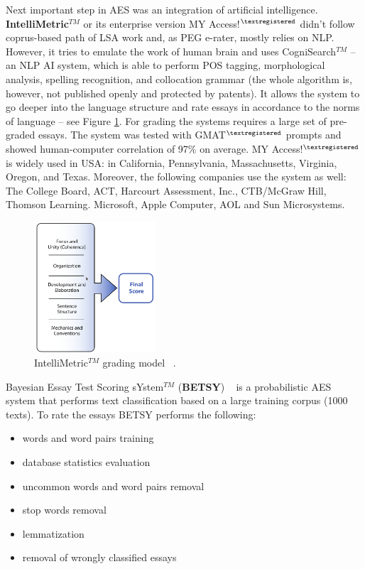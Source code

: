 Next important step in AES was an integration of artificial intelligence. \textbf{IntelliMetric$^{TM}$} or its enterprise version MY Access!$^{\tiny{\textregistered}}$ didn't follow coprus-based path of LSA work and, as PEG e-rater, mostly relies on NLP. However, it tries to emulate the work of human brain and uses CogniSearch$^{TM}$ -- an NLP AI system, which is able to perform POS tagging, morphological analysis, spelling recognition, and collocation grammar (the whole algorithm is, however, not published openly and  protected by patents). It allows the system to go deeper into the language structure and rate essays in accordance to the norms of language -- see Figure \ref{fig:IntelliMetric}. For grading the systems requires a large set of pre-graded essays. The system was tested with GMAT$^{\tiny{\textregistered}}$ prompts and showed human-computer correlation of 97\% on average. MY Access!$^{\tiny{\textregistered}}$ is widely used in USA: in California, Pennsylvania, Massachusetts, Virginia, Oregon, and Texas. Moreover, the following companies use the system as well: The College Board, ACT, Harcourt Assessment, Inc., CTB/McGraw Hill, Thomson Learning. Microsoft, Apple Computer, AOL and Sun Microsystems. 

\begin{figure}[h!]
  \centering
  \includegraphics[width=0.4\textwidth]{img/IntelliMetric}
    \caption{IntelliMetric$^{TM}$ grading model ~\cite{Dikli}.\label{fig:IntelliMetric}}
\end{figure}

Bayesian Essay Test Scoring sYstem$^{TM}$ (\textbf{BETSY}) ~\cite{BETSY} is a probabilistic AES system that performs text classification based on a large training corpus (1000 texts). To rate the essays BETSY performs the following:

\begin{itemize}
\item words and word pairs training
\item database statistics evaluation
\item uncommon words and word pairs removal
\item stop words removal
\item lemmatization
\item removal of wrongly classified essays 
\end{itemize}

